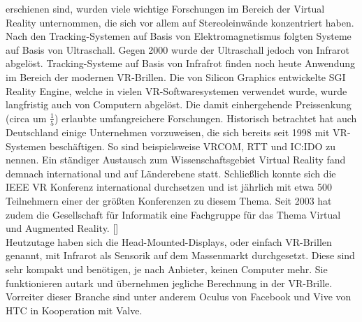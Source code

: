 \documentclass[a4paper,12pt,oneside]{article}
\begin{document}
        erschienen sind, wurden viele wichtige Forschungen im Bereich der Virtual Reality
        unternommen, die sich vor allem auf Stereoleinwände konzentriert haben.
        Nach den Tracking-Systemen auf Basis von Elektromagnetismus folgten Systeme auf
        Basis von Ultraschall. Gegen 2000 wurde der Ultraschall jedoch von Infrarot
        abgelöst. Tracking-Systeme auf Basis von Infrafrot finden noch heute Anwendung im
        Bereich der modernen VR-Brillen.
        Die von Silicon Graphics entwickelte SGI Reality Engine, welche in vielen
        VR-Softwaresystemen verwendet wurde, wurde langfristig auch von Computern
        abgelöst. Die damit einhergehende Preissenkung (circa um $\frac{1}{5}$)
        erlaubte umfangreichere Forschungen.
        Historisch betrachtet hat auch Deutschland einige Unternehmen vorzuweisen, die sich
        bereits seit 1998 mit VR-Systemen beschäftigen. So sind beispielsweise VRCOM, 
        RTT und IC:IDO zu nennen.
        Ein ständiger Austausch zum Wissenschaftsgebiet Virtual Reality fand demnach international
        und auf Länderebene statt. Schließlich konnte sich die IEEE VR Konferenz
        international durchsetzen und ist jährlich mit etwa 500 Teilnehmern einer der
        größten Konferenzen zu diesem Thema.
        Seit 2003 hat zudem die Gesellschaft für Informatik eine Fachgruppe für das Thema
        Virtual und Augmented Reality. [\cite[19-21]{Dorner2013}] \\
        Heutzutage haben sich die Head-Mounted-Displays, oder einfach VR-Brillen genannt,
        mit Infrarot als Sensorik auf dem Massenmarkt durchgesetzt. Diese sind sehr kompakt
        und benötigen, je nach Anbieter, keinen Computer mehr. Sie funktionieren autark und
        übernehmen jegliche Berechnung in der VR-Brille. Vorreiter dieser Branche sind unter
        anderem Oculus von Facebook und Vive von HTC in Kooperation mit Valve.
\end{document}
